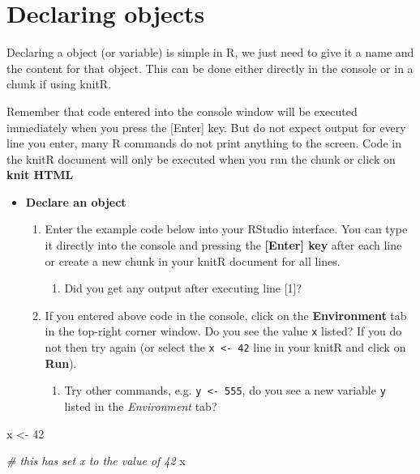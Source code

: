 \documentclass[a4paper]{book}
\newenvironment{Shaded}{\begin{snugshade}}{\end{snugshade}}
\newcommand{\DecValTok}[1]{\textcolor[rgb]{0.00,0.00,0.81}{{#1}}}
\newcommand{\StringTok}[1]{\textcolor[rgb]{0.31,0.60,0.02}{{#1}}}
\newcommand{\CommentTok}[1]{\textcolor[rgb]{0.56,0.35,0.01}{\textit{{#1}}}}
\newcommand{\NormalTok}[1]{{#1}}
\providecommand{\tightlist}{%
  \setlength{\itemsep}{0pt}\setlength{\parskip}{0pt}}
\renewenvironment{Shaded}
{\vspace{1.5em}\begin{leftbar}\begin{snugshade}}
{\end{snugshade}\end{leftbar}\vspace{3pt}}
\newenvironment{rmdblock}[1]
  {\vspace{1.5em}\begin{shaded*}
  \begin{itemize}
  \renewcommand{\labelitemi}{
    \raisebox{-.7\height}[0pt][0pt]{
      {\setkeys{Gin}{width=3em,keepaspectratio}\texttt{[image: images/\#1]}}
    }
  }
  \item
  }
  {
  \end{itemize}
  \end{shaded*}
  }
\newenvironment{rmdexercise}
  {\begin{rmdblock}{exercise}}
  {\end{rmdblock}}
\begin{document}
\section{Declaring objects}\label{declaring-objects}

Declaring a object (or variable) is simple in R, we just need to give it
a name and the content for that object. This can be done either directly
in the console or in a chunk if using knitR.

Remember that code entered into the console window will be executed
immediately when you press the {[}Enter{]} key. But do not expect output
for every line you enter, many R commands do not print anything to the
screen. Code in the knitR document will only be executed when you run
the chunk or click on \textbf{knit HTML}

\begin{rmdexercise}
\textbf{Declare an object}

\begin{enumerate}
\def\labelenumi{\arabic{enumi}.}
\item
  Enter the example code below into your RStudio interface. You can type
  it directly into the console and pressing the \textbf{{[}Enter{]} key}
  after each line or create a new chunk in your knitR document for all
  lines.

  \begin{enumerate}
  \def\labelenumii{\alph{enumii})}
  \tightlist
  \item
    Did you get any output after executing line {[}1{]}?
  \end{enumerate}
\item
  If you entered above code in the console, click on the
  \textbf{Environment} tab in the top-right corner window. Do you see
  the value \texttt{x} listed? If you do not then try again (or select
  the \texttt{x\ \textless{}-\ 42} line in your knitR and click on
  \textbf{Run}).

  \begin{enumerate}
  \def\labelenumii{\alph{enumii})}
  \tightlist
  \item
    Try other commands, e.g. \texttt{y\ \textless{}-\ 555}, do you see a
    new variable \texttt{y} listed in the \emph{Environment} tab?
  \end{enumerate}
\end{enumerate}
\end{rmdexercise}

\begin{Shaded}
\begin{Highlighting}[]
\NormalTok{x <-}\StringTok{ }\DecValTok{42}

\CommentTok{# this has set x to the value of 42}
\NormalTok{x}
\end{Highlighting}
\end{Shaded}
\end{document}
